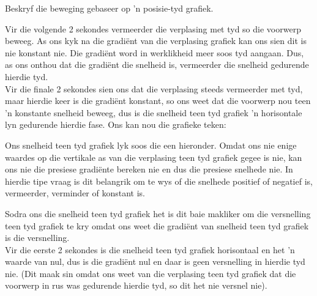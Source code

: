 \begin{wex}{Beskryf die beweging gebaseer op 'n posisie-tyd grafiek.}
{
Vir die volgende 2 sekondes vermeerder die verplasing met tyd so die voorwerp beweeg. As ons kyk na die gradi\"ent van die verplasing grafiek kan ons sien dit is nie konstant nie. Die gradi\"ent word in werklikheid meer soos tyd aangaan. Dus, as ons onthou dat die gradi\"ent die snelheid is, vermeerder die snelheid gedurende hierdie tyd. \\

Vir die finale 2 sekondes sien ons dat die verplasing steeds vermeerder met tyd, maar hierdie keer is die gradi\"ent konstant, so ons weet dat die voorwerp nou teen 'n konstante snelheid beweeg, dus is die snelheid teen tyd grafiek 'n horisontale lyn gedurende hierdie fase. Ons kan nou die grafieke teken:

Ons snelheid teen tyd grafiek lyk soos die een hieronder. Omdat ons nie enige waardes op die vertikale as van die verplasing teen tyd grafiek gegee is nie, kan ons nie die presiese gradi\"ente bereken nie en dus die presiese snelhede nie. In hierdie tipe vraag is dit belangrik om te wys of die snelhede positief of negatief is, vermeerder, verminder of konstant is.

\begin{center}
\end{center}

Sodra ons die snelheid teen tyd grafiek het is dit baie makliker om die versnelling teen tyd grafiek te kry omdat ons weet die gradi\"ent van snelheid teen tyd grafiek is die versnelling.\\

Vir die eerste 2 sekondes is die snelheid teen tyd grafiek horisontaal en het 'n waarde van nul, dus is die gradi\"ent nul en daar is geen versnelling in hierdie tyd nie. (Dit maak sin omdat ons weet van die verplasing teen tyd grafiek dat die voorwerp in rus was gedurende hierdie tyd, so dit het nie versnel nie).\\ 

}
\end{wex}
